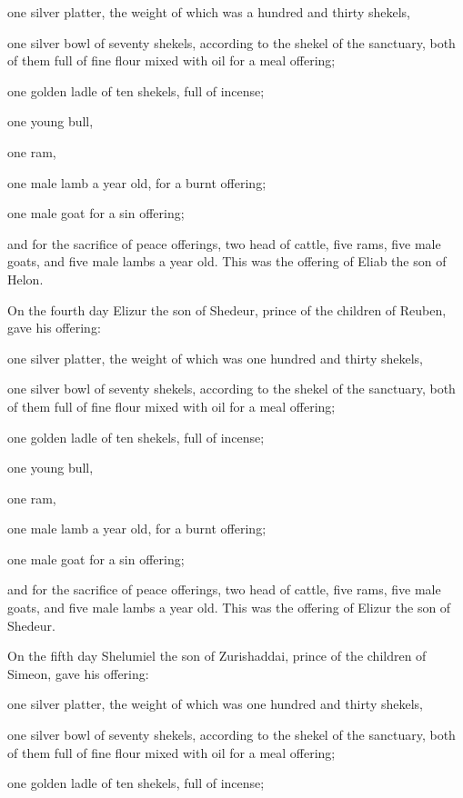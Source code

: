 one silver platter, the weight of which was a hundred and thirty
shekels,

one silver bowl of seventy shekels, according to the shekel of the
sanctuary, both of them full of fine flour mixed with oil for a meal
offering;

 one golden ladle of ten shekels, full of incense;

 one young bull,

one ram,

one male lamb a year old, for a burnt offering;

 one male goat for a sin offering;

 and for the sacrifice of peace offerings, two head of
cattle, five rams, five male goats, and five male lambs a year old. This
was the offering of Eliab the son of Helon.

 On the fourth day Elizur the son of Shedeur, prince of the
children of Reuben,  gave his offering:

one silver platter, the weight of which was one hundred and thirty
shekels,

one silver bowl of seventy shekels, according to the shekel of the
sanctuary, both of them full of fine flour mixed with oil for a meal
offering;

 one golden ladle of ten shekels, full of incense;

 one young bull,

one ram,

one male lamb a year old, for a burnt offering;

 one male goat for a sin offering;

 and for the sacrifice of peace offerings, two head of
cattle, five rams, five male goats, and five male lambs a year old. This
was the offering of Elizur the son of Shedeur.

 On the fifth day Shelumiel the son of Zurishaddai, prince
of the children of Simeon,  gave his offering:

one silver platter, the weight of which was one hundred and thirty
shekels,

one silver bowl of seventy shekels, according to the shekel of the
sanctuary, both of them full of fine flour mixed with oil for a meal
offering;

 one golden ladle of ten shekels, full of incense;

